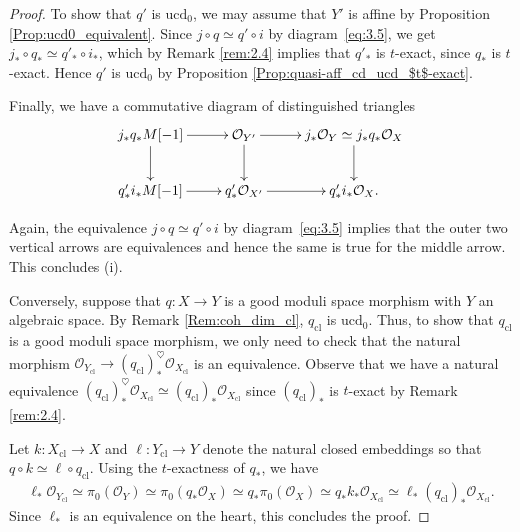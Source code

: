 \documentclass[a4paper,twoside,11pt]{amsart}
\theoremstyle{plain}
\theoremstyle{definition}
\theoremstyle{remark}
\numberwithin{equation}{section}
\newcommand{\ucd}{$\mathrm{ucd}_{0}$\xspace}
\newcommand{\cl}{\mathrm{cl}} %
\newcommand{\oO}{\mathcal{O}}
\begin{document}
\begin{proof}
To show that $q'$ is \ucd, we may assume that $Y'$ is affine by Proposition \ref{Prop:ucd0_equivalent}. Since $j \circ q \simeq q' \circ i$ by diagram~\eqref{eq:3.5}, we get $j_\ast \circ q_\ast \simeq q'_\ast \circ i_\ast$, which by Remark \ref{rem:2.4} implies that $q'_*$ is $t$-exact, since $q_*$ is $t$-exact. Hence $q'$ is \ucd by Proposition \ref{Prop:quasi-aff_cd_ucd_$t$-exact}. 

Finally, we have a commutative diagram of distinguished triangles
\begin{align*}
    \xymatrix{
    j_\ast q_\ast M[-1] \ar[r] \ar[d] & \oO_{Y'} \ar[r] \ar[d] & j_\ast \oO_Y \simeq j_\ast q_\ast \oO_X \ar[d] \\
    q'_\ast i_\ast M[-1] \ar[r] & q'_\ast \oO_{X'} \ar[r] & q'_\ast i_\ast \oO_X.
    }
\end{align*}

Again, the equivalence $j \circ q \simeq q' \circ i$ by diagram~\eqref{eq:3.5} implies that the outer two vertical arrows are equivalences and hence the same is true for the middle arrow. This concludes (i).

Conversely, suppose that $q \colon X \to Y$ is a good moduli space morphism with $Y$ an algebraic space. By Remark \ref{Rem:coh_dim_cl}, $q_\cl$ is \ucd. Thus, to show that $q_\cl$ is a good moduli space morphism, we only need to check that the natural morphism $\oO_{Y_\cl} \to (q_{\cl})_\ast^{\heartsuit} \oO_{X_\cl}$ is an equivalence. Observe that we have a natural equivalence $(q_\cl)_\ast^{\heartsuit} \oO_{X_\cl} \simeq (q_\cl)_\ast \oO_{X_\cl}$ since $(q_\cl)_*$ is $t$-exact by Remark \ref{rem:2.4}.

Let $k \colon X_\cl \to X$ and $\ell \colon Y_\cl \to Y$ denote the natural closed embeddings so that $q \circ k \simeq \ell \circ q_\cl$. Using the $t$-exactness of $q_\ast$, we have
\begin{align*}
    \ell_\ast \oO_{Y_\cl} \simeq \pi_0(\oO_Y) \simeq \pi_0 (q_\ast \oO_X) \simeq q_\ast \pi_0(\oO_X) \simeq q_\ast k_\ast \oO_{X_\cl} \simeq \ell_\ast (q_\cl)_\ast \oO_{X_\cl}.
\end{align*}
Since $\ell_\ast$ is an equivalence on the heart, this concludes the proof.
\end{proof}
\end{document}
